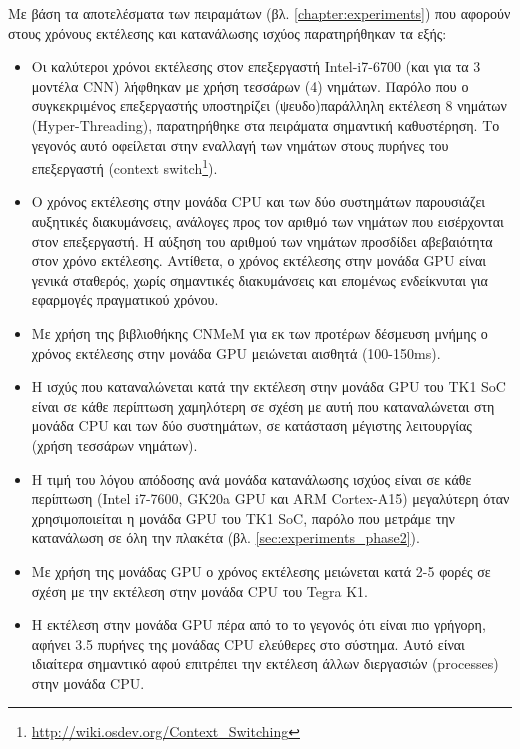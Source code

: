 Με βάση τα αποτελέσματα των πειραμάτων (βλ. \autoref{chapter:experiments})
που αφορούν στους χρόνους εκτέλεσης και κατανάλωσης ισχύος παρατηρήθηκαν τα
εξής:
\begin{itemize}
  \item{
      Οι καλύτεροι χρόνοι εκτέλεσης στον επεξεργαστή Intel-i7-6700 (και για τα 3 μοντέλα CNN)
      λήφθηκαν με χρήση τεσσάρων (4) νημάτων.
      Παρόλο που ο συγκεκριμένος επεξεργαστής υποστηρίζει (ψευδο)παράλληλη
      εκτέλεση 8 νημάτων (Hyper-Threading), παρατηρήθηκε στα πειράματα σημαντική
      καθυστέρηση. Το γεγονός αυτό οφείλεται στην εναλλαγή των νημάτων στους
      πυρήνες του επεξεργαστή
      (context switch\footnote{\url{http://wiki.osdev.org/Context_Switching}}).
    }
  \item{
      Ο χρόνος εκτέλεσης στην μονάδα CPU και των δύο συστημάτων παρουσιάζει αυξητικές διακυμάνσεις,
      ανάλογες προς τον αριθμό των νημάτων που εισέρχονται στον επεξεργαστή.
      Η αύξηση του αριθμού των νημάτων προσδίδει αβεβαιότητα στον χρόνο
      εκτέλεσης. Αντίθετα, ο χρόνος εκτέλεσης στην μονάδα GPU είναι γενικά σταθερός,
      χωρίς σημαντικές διακυμάνσεις και επομένως ενδείκνυται για εφαρμογές
      πραγματικού χρόνου.
      }
  \item{
      Με χρήση της βιβλιοθήκης CNMeM για εκ των προτέρων δέσμευση μνήμης
      ο χρόνος εκτέλεσης στην μονάδα GPU μειώνεται αισθητά (100-150ms).
    }
  \item{
      Η ισχύς που καταναλώνεται κατά την εκτέλεση στην μονάδα GPU του TK1 SoC είναι σε κάθε περίπτωση χαμηλότερη σε σχέση
      με αυτή που καταναλώνεται στη μονάδα CPU και των δύο συστημάτων, σε
      κατάσταση μέγιστης λειτουργίας (χρήση τεσσάρων νημάτων).
    }
  \item{
      Η τιμή του λόγου απόδοσης ανά μονάδα κατανάλωσης ισχύος
      είναι σε κάθε περίπτωση (Intel i7-7600, GK20a GPU και ARM Cortex-A15) μεγαλύτερη όταν χρησιμοποιείται η μονάδα GPU
      του TK1 SoC, παρόλο που μετράμε την κατανάλωση σε όλη την πλακέτα (βλ. \autoref{sec:experiments_phase2}).
    }
  \item{
      Με χρήση της μονάδας GPU ο χρόνος εκτέλεσης μειώνεται κατά
      2-5 φορές σε σχέση με την εκτέλεση στην μονάδα CPU του Tegra K1.
    }
  \item{
      Η εκτέλεση στην μονάδα GPU πέρα από το το γεγονός ότι είναι πιο γρήγορη,
      αφήνει 3.5 πυρήνες της μονάδας CPU ελεύθερες στο σύστημα.
      Αυτό είναι ιδιαίτερα σημαντικό αφού επιτρέπει την εκτέλεση άλλων
      διεργασιών (processes) στην μονάδα CPU.
    }
\end{itemize}

